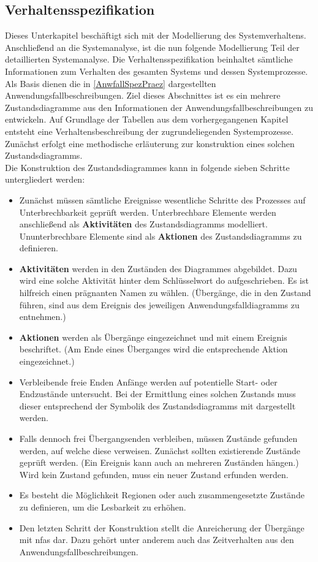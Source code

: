 \documentclass[../Bachelorarbeit.tex]{subfiles}
\begin{document}
\subsection{Verhaltensspezifikation}
Dieses Unterkapitel beschäftigt sich mit der Modellierung des Systemverhaltens. Anschließend an die Systemanalyse, ist die nun folgende Modellierung Teil der detaillierten Systemanalyse. Die Verhaltensspezifikation beinhaltet sämtliche Informationen zum Verhalten des gesamten Systems und dessen Systemprozesse. Als Basis dienen die in \autoref{AnwfallSpezPraez} dargestellten Anwendungsfallbeschreibungen. Ziel dieses Abschnittes ist es ein \bzw mehrere Zustandsdiagramme aus den Informationen der Anwendungsfallbeschreibungen zu entwickeln. Auf Grundlage der Tabellen aus dem vorhergegangenen Kapitel entsteht eine Verhaltensbeschreibung der zugrundeliegenden Systemprozesse. Zunächst erfolgt eine methodische erläuterung zur konstruktion eines solchen Zustandsdiagramms. \\
Die Konstruktion des Zustandsdiagrammes kann in folgende sieben Schritte untergliedert werden:
\begin{itemize}
    \item Zunächst müssen sämtliche Ereignisse \bzw wesentliche Schritte des Prozesses auf Unterbrechbarkeit geprüft werden. Unterbrechbare Elemente werden anschließend als \textbf{Aktivitäten} des Zustandsdiagramms modelliert. Ununterbrechbare Elemente sind als \textbf{Aktionen} des Zustandsdiagramms zu definieren.
    \item \textbf{Aktivitäten} werden in den Zuständen des Diagrammes abgebildet. Dazu wird eine solche Aktivität hinter dem Schlüsselwort \glqq do\grqq{} aufgeschrieben. Es ist hilfreich einen prägnanten Namen zu wählen. (Übergänge, die in den Zustand führen, sind aus dem Ereignis des jeweiligen Anwendungsfalldiagramms zu entnehmen.)
    \item \textbf{Aktionen} werden als Übergänge eingezeichnet und mit einem Ereignis beschriftet. (Am Ende eines Überganges wird die entsprechende Aktion eingezeichnet.)
    \item Verbleibende freie Enden \bzw Anfänge werden auf potentielle Start- oder Endzustände untersucht. Bei der Ermittlung eines solchen Zustands muss dieser entsprechend der Symbolik des Zustandsdiagramms mit dargestellt werden.
    \item Falls dennoch frei Übergangsenden verbleiben, müssen Zustände gefunden werden, auf welche diese verweisen. Zunächst sollten existierende Zustände geprüft werden. (Ein Ereignis kann auch an mehreren Zuständen hängen.) Wird kein Zustand gefunden, muss ein neuer Zustand erfunden werden.
    \item Es besteht die Möglichkeit Regionen oder auch zusammengesetzte Zustände zu definieren, um die Lesbarkeit zu erhöhen.
    \item Den letzten Schritt der Konstruktion stellt die Anreicherung der Übergänge mit \acp{nfa} dar. Dazu gehört unter anderem auch das Zeitverhalten aus den Anwendungsfallbeschreibungen. 
\end{itemize}
\end{document}
